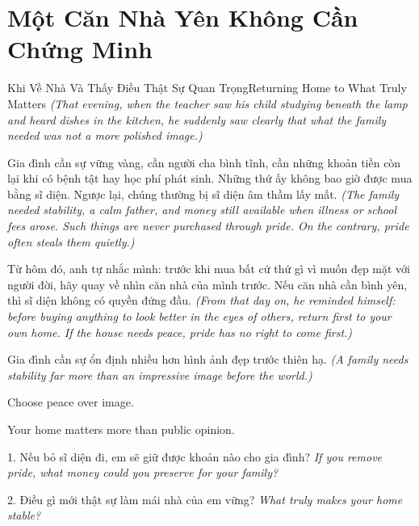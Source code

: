 \section{Một Căn Nhà Yên Không Cần Chứng Minh}
\begin{truyen}{Khi Về Nhà Và Thấy Điều Thật Sự Quan Trọng}{Returning Home to What Truly Matters}
\textit{(That evening, when the teacher saw his child studying beneath the lamp and heard dishes in the kitchen, he suddenly saw clearly that what the family needed was not a more polished image.)}

Gia đình cần sự vững vàng, cần người cha bình tĩnh, cần những khoản tiền còn lại khi có bệnh tật hay học phí phát sinh. Những thứ ấy không bao giờ được mua bằng sĩ diện. Ngược lại, chúng thường bị sĩ diện âm thầm lấy mất.
\textit{(The family needed stability, a calm father, and money still available when illness or school fees arose. Such things are never purchased through pride. On the contrary, pride often steals them quietly.)}

Từ hôm đó, anh tự nhắc mình: trước khi mua bất cứ thứ gì vì muốn đẹp mặt với người đời, hãy quay về nhìn căn nhà của mình trước. Nếu căn nhà cần bình yên, thì sĩ diện không có quyền đứng đầu.
\textit{(From that day on, he reminded himself: before buying anything to look better in the eyes of others, return first to your own home. If the house needs peace, pride has no right to come first.)}
\end{truyen}

\begin{baihoc}
Gia đình cần sự ổn định nhiều hơn hình ảnh đẹp trước thiên hạ.
\textit{(A family needs stability far more than an impressive image before the world.)}
\end{baihoc}

\begin{ghinhoanh}
Choose peace over image.

Your home matters more than public opinion.
\end{ghinhoanh}

\begin{tuhocnhanh}
1. Nếu bỏ sĩ diện đi, em sẽ giữ được khoản nào cho gia đình? \textit{If you remove pride, what money could you preserve for your family?}

2. Điều gì mới thật sự làm mái nhà của em vững? \textit{What truly makes your home stable?}
\end{tuhocnhanh}

